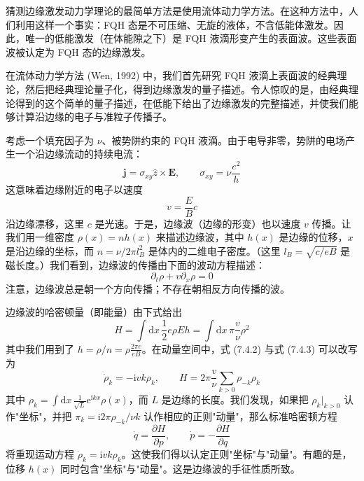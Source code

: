 猜测边缘激发动力学理论的最简单方法是使用流体动力学方法。在这种方法中，人们利用这样一个事实：FQH 态是不可压缩、无旋的液体，不含低能体激发。因此，唯一的低能激发（在体能隙之下）是 FQH 液滴形变产生的表面波。这些表面波被认定为 FQH 态的边缘激发。

在流体动力学方法 (Wen, 1992) 中，我们首先研究 FQH 液滴上表面波的经典理论，然后把经典理论量子化，得到边缘激发的量子描述。令人惊叹的是，由经典理论得到的这个简单的量子描述，在低能下给出了边缘激发的完整描述，并使我们能够计算沿边缘的电子与准粒子传播子。

考虑一个填充因子为 $\nu$、被势阱约束的 FQH 液滴。由于电导非零，势阱的电场产生一个沿边缘流动的持续电流：
\begin{equation*}
\pmb{j}=\sigma_{xy}\hat{z}\times\pmb{E},\qquad \sigma_{xy}=\nu\frac{e^{2}}{h}
\end{equation*}
这意味着边缘附近的电子以速度
\begin{equation*}
v=\frac{E}{B}c
\end{equation*}
沿边缘漂移，这里 $c$ 是光速。于是，边缘波（边缘的形变）也以速度 $v$ 传播。让我们用一维密度 $\rho(x)=nh(x)$ 来描述边缘波，其中 $h(x)$ 是边缘的位移，$x$ 是沿边缘的坐标，而 $n=\nu/2\pi l_{B}^{2}$ 是体内的二维电子密度。（这里 $l_{B}=\sqrt{c/eB}$ 是磁长度。）我们看到，边缘波的传播由下面的波动方程描述：
\begin{equation*}
\partial_{t}\rho+v\partial_{x}\rho=0 \tag{7.4.2}
\end{equation*}
注意，边缘波总是朝一个方向传播；不存在朝相反方向传播的波。

边缘波的哈密顿量（即能量）由下式给出
\begin{equation*}
H=\int\mathrm{d}x\,\frac{1}{2}e\rho E h=\int\mathrm{d}x\,\pi\frac{v}{\nu}\rho^{2} \tag{7.4.3}
\end{equation*}
其中我们用到了 $h=\rho/n=\rho\frac{2\pi c}{eB}$。在动量空间中，式 (7.4.2) 与式 (7.4.3) 可以改写为
\begin{equation*}
\dot{\rho}_{k}=-\mathrm{i}vk\rho_{k},\qquad
H=2\pi\frac{v}{\nu}\sum_{k>0}\rho_{-k}\rho_{k} \tag{7.4.4}
\end{equation*}
其中 $\rho_{k}=\int\mathrm{d}x\,\frac{1}{\sqrt{L}}\mathrm{e}^{\mathrm{i}kx}\rho(x)$，而 $L$ 是边缘的长度。我们发现，如果把 $\rho_{k}|_{k>0}$ 认作"坐标"，并把 $\pi_{k}=\mathrm{i}2\pi\rho_{-k}/\nu k$ 认作相应的正则"动量"，那么标准哈密顿方程
\begin{equation*}
\dot{q}=\frac{\partial H}{\partial p},\qquad \dot{p}=-\frac{\partial H}{\partial q}
\end{equation*}
将重现运动方程 $\dot{\rho}_{k}=\mathrm{i}vk\rho_{k}$。这使我们得以认定正则"坐标"与"动量"。有趣的是，位移 $h(x)$ 同时包含"坐标"与"动量"。这是边缘波的手征性质所致。

